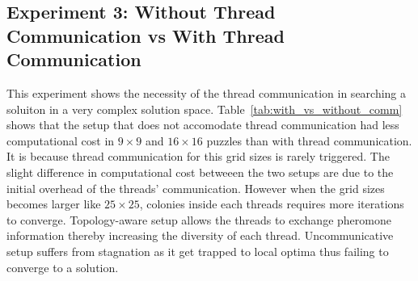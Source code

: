 \subsection{Experiment 3: Without Thread Communication vs With Thread Communication}
        This experiment shows the necessity of the thread communication in searching a soluiton in a very complex solution space. Table~\ref{tab:with_vs_without_comm} shows that the setup that does not accomodate thread communication had less computational cost in $9\times9$ and $16\times16$ puzzles than with thread communication. It is because thread communication for this grid sizes is rarely triggered. The slight difference in computational cost betweeen the two setups are due to the initial overhead of the threads' communication. However when the grid sizes becomes larger like $25\times25$, colonies inside each threads requires more iterations to converge. Topology-aware setup allows the threads to exchange pheromone information thereby increasing the diversity of each thread. Uncommunicative setup suffers from stagnation as it get trapped to local optima thus failing to converge to a solution. 


